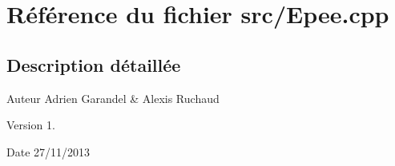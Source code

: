 \section{Référence du fichier src/\-Epee.cpp}
\label{_epee_8cpp}


\subsection{Description détaillée}
\begin{DoxyAuthor}{Auteur}
Adrien Garandel \& Alexis Ruchaud 
\end{DoxyAuthor}
\begin{DoxyVersion}{Version}
1. 
\end{DoxyVersion}
\begin{DoxyDate}{Date}
27/11/2013 
\end{DoxyDate}
